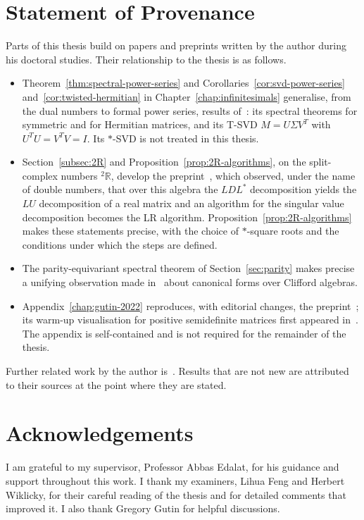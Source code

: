 \documentclass[12pt, a4paper]{report}
\theoremstyle{plain}
\theoremstyle{definition}
\theoremstyle{remark}
\theoremstyle{plain}
\newcommand{\twoR}{{}^{2}\mathbb{R}}
\begin{document}
\chapter*{Statement of Provenance}
Parts of this thesis build on papers and preprints written by the author during his doctoral studies. Their relationship to the thesis is as follows.
\begin{itemize}
  \item Theorem~\ref{thm:spectral-power-series} and Corollaries~\ref{cor:svd-power-series} and~\ref{cor:twisted-hermitian} in Chapter~\ref{chap:infinitesimals} generalise, from the dual numbers to formal power series, results of~\cite{Gutin2022DualNumbers}: its spectral theorems for symmetric and for Hermitian matrices, and its T-SVD $M=U\Sigma V^T$ with $U^TU=V^TV=I$. Its $*$-SVD is not treated in this thesis.
  \item Section~\ref{subsec:2R} and Proposition~\ref{prop:2R-algorithms}, on the split-complex numbers $\twoR$, develop the preprint~\cite{Gutin2021DoubleNumbers}, which observed, under the name of double numbers, that over this algebra the $LDL^*$ decomposition yields the $LU$ decomposition of a real matrix and an algorithm for the singular value decomposition becomes the LR algorithm. Proposition~\ref{prop:2R-algorithms} makes these statements precise, with the choice of $*$-square roots and the conditions under which the steps are defined.
  \item The parity-equivariant spectral theorem of Section~\ref{sec:parity} makes precise a unifying observation made in~\cite{Gutin2024Clifford} about canonical forms over Clifford algebras.
  \item Appendix~\ref{chap:gutin-2022} reproduces, with editorial changes, the preprint~\cite{Gutin2022Visualisation}; its warm-up visualisation for positive semidefinite matrices first appeared in~\cite{Gutin2022PSD}. The appendix is self-contained and is not required for the remainder of the thesis.
\end{itemize}
Further related work by the author is~\cite{Gutin2021AllRings,Gutin2023DoubleComplex,Gutin2023Conjecture}. Results that are not new are attributed to their sources at the point where they are stated.

\chapter*{Acknowledgements}
I am grateful to my supervisor, Professor Abbas Edalat, for his guidance and support throughout this work. I thank my examiners, Lihua Feng and Herbert Wiklicky, for their careful reading of the thesis and for detailed comments that improved it. I also thank Gregory Gutin for helpful discussions.
\end{document}
